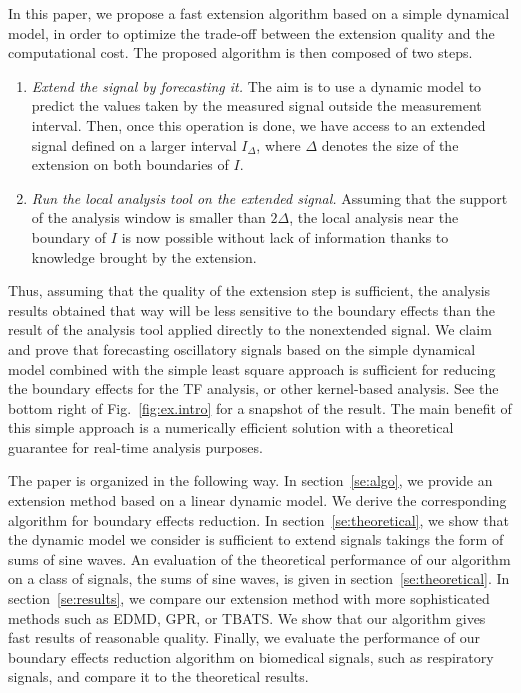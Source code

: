 \documentclass[journal]{IEEEtran}
\begin{document}
In this paper, we propose a fast extension algorithm based on a simple dynamical model, in order to optimize the trade-off between the extension quality and the computational cost. The proposed algorithm is then composed of two steps.
\begin{enumerate}
\item \emph{Extend the signal by forecasting it.} The aim is to use a dynamic model to predict the values taken by the measured signal outside the measurement interval. Then, once this operation is done, we have access to an extended signal defined on a larger interval $I_\Delta$, where $\Delta$ denotes the size of the extension on both boundaries of $I$.
\item \emph{Run the local analysis tool on the extended signal.} Assuming that the support of the analysis window is smaller than $2\Delta$, the local analysis near the boundary of $I$ is now possible without lack of information thanks to knowledge brought by the extension. 
\end{enumerate}
Thus, assuming that the quality of the extension step is sufficient, the analysis results obtained that way will be less sensitive to the boundary effects than the result of the analysis tool applied directly to the nonextended signal. We claim and prove that forecasting oscillatory signals based on the simple dynamical model combined with the simple least square approach is sufficient for reducing the boundary effects for the TF analysis, or other kernel-based analysis. See the bottom right of Fig.~\ref{fig:ex.intro} for a snapshot of the result. The main benefit of this simple approach is a numerically efficient solution with a theoretical guarantee for real-time analysis purposes. 

The paper is organized in the following way. In section~\ref{se:algo}, we provide an extension method based on a linear dynamic model. We derive the corresponding algorithm for boundary effects reduction. In section~\ref{se:theoretical}, we show that the dynamic model we consider is sufficient to extend signals takings the form of sums of sine waves. An evaluation of the theoretical performance of our algorithm on a class of signals, the sums of sine waves, is given in section~\ref{se:theoretical}. In section~\ref{se:results}, we compare our extension method with more sophisticated methods such as EDMD, GPR, or TBATS. We show that our algorithm gives fast results of reasonable quality. Finally, we evaluate the performance of our boundary effects reduction algorithm on biomedical signals, such as respiratory signals, and compare it to the theoretical results. 
\end{document}

